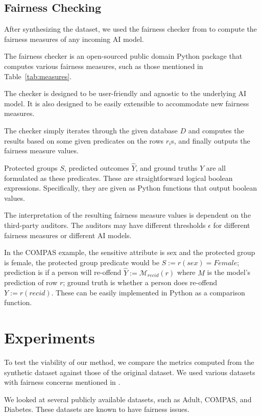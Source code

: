 \documentclass[manuscript,screen,review,anonymous]{acmart}
\newcommand{\db}{D}
\begin{document}
\subsection{Fairness Checking}

After synthesizing the dataset, we used the fairness checker from \cite{yuan2024ensuring} to compute the fairness measures of any incoming AI model.

The fairness checker is an open-sourced public domain Python package that computes various fairness measures, such as those mentioned in Table~\ref{tab:measures}.

The checker is designed to be user-friendly and agnostic to the underlying AI model. It is also designed to be easily extensible to accommodate new fairness measures.

The checker simply iterates through the given database $\db$ and computes the results based on some given predicates on the rows $r_i$s, and finally outputs the fairness measure values.

Protected groups $S$, predicted outcomes $\hat{Y}$, and ground truths $Y$ are all formulated as these predicates. These are straightforward logical boolean expressions. Specifically, they are given as Python functions that output boolean values.

The interpretation of the resulting fairness measure values is dependent on the third-party auditors. The auditors may have different thresholds $\epsilon$ for different fairness measures or different AI models.

In the COMPAS example, the sensitive attribute is sex and the protected group is female, the protected group predicate would be $S := r(sex) = Female$; prediction is if a person will re-offend $\hat{Y} := \mathcal{M}_{recid}(r)$ where $M$ is the model's prediction of row $r$; ground truth is whether a person does re-offend $Y := r(recid)$. These can be easily implemented in Python as a comparison function.

\section{Experiments}

To test the viability of our method, we compare the metrics computed from the synthetic dataset against those of the original dataset. We used various datasets with fairness concerns mentioned in \cite{pessach2022review}.

We looked at several publicly available datasets, such as Adult\cite{adult_2,Kaggle_Adult_Census_Income}, COMPAS\cite{larson2016propublica,Kaggle_COMPAS_Dataset}, and Diabetes\cite{diabetes_34,Kaggle_Diabetes_Prediction}. These datasets are known to have fairness issues\cite{pessach2022review}.
\end{document}
